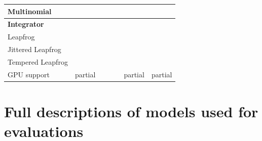 \documentclass[tablecaption=bottom,wcp]{jmlr} %
\newcommand{\cmark}{\color{forestgreen}{\ding{51}}}
\newcommand{\xmark}{\color{red}{\ding{55}}}
\begin{document}
\begin{table}[htbp]
{\begin{tabular}{l|cccccc}
    Multinomial & \cmark & \cmark & \cmark & \cmark & \cmark &\cmark \\
    \hline
    \textbf{Integrator} \\
    Leapfrog & \cmark &\cmark  & \cmark & \cmark & \cmark & \cmark\\
    Jittered Leapfrog & \cmark & \cmark & \xmark & \xmark & \xmark &\xmark \\
    Tempered Leapfrog & \xmark &\cmark  & \xmark & \xmark & \xmark & \xmark\\
    \hline
    GPU support & partial & \cmark & \cmark & \cmark & partial & partial \\
    \end{tabular}
    }
\end{table}

\section{Full descriptions of models used for evaluations}
\label{app:models}

\end{document}
